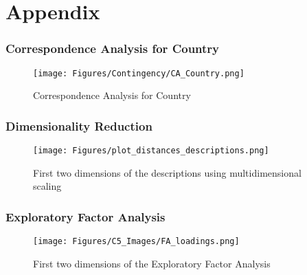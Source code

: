 \documentclass{beamer}
\begin{document}
\section{Appendix}
\begin{frame}[plain]
\frametitle{Correspondence Analysis for Country}
\begin{figure}
\texttt{[image: Figures/Contingency/CA\_Country.png]}
\caption{Correspondence Analysis for Country}
\label{fig:CA_Country}
\end{figure}
\end{frame}

\begin{frame}[plain]
\frametitle{Dimensionality Reduction}
\begin{figure}
\texttt{[image: Figures/plot\_distances\_descriptions.png]}
\caption{First two dimensions of the descriptions using multidimensional scaling}
\label{fig:DR_distances}
\end{figure}
\end{frame}

\begin{frame}[plain]
\frametitle{Exploratory Factor Analysis}
\begin{figure}
\texttt{[image: Figures/C5\_Images/FA\_loadings.png]}%
\caption{First two dimensions of the Exploratory Factor Analysis}
\label{fig:FA}
\end{figure}
\end{frame}
\end{document}
